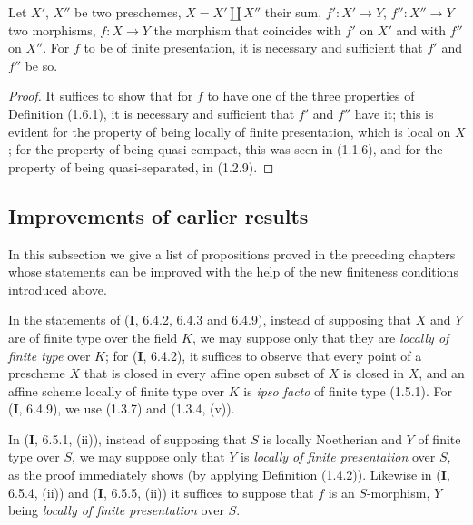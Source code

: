 \begin{proposition}[1.6.5]
\label{IV.1.6.5}
Let $X'$, $X''$ be two preschemes, $X=X'\amalg X''$ their sum,
$f':X'\to Y$, $f'':X''\to Y$ two morphisms, $f:X\to Y$ the morphism that
coincides with $f'$ on $X'$ and with $f''$ on $X''$. For $f$ to be of
finite presentation, it is necessary and sufficient that $f'$ and $f''$ be so.
\end{proposition}

\par\medskip\noindent
\begin{proof}
It suffices to show that for $f$ to have one of the three properties of
Definition
(1.6.1), it is necessary and sufficient that $f'$ and $f''$ have it; this is
evident for the property of being locally of finite presentation, which is
local on $X$; for the property of being quasi-compact, this was seen in
(1.1.6), and for the property of being quasi-separated, in (1.2.9).
\end{proof}


\subsection{Improvements of earlier results}
\label{subsection:IV.1.7}

In this subsection we give a list of propositions proved in the preceding
chapters whose statements can be improved with the help of the new
finiteness conditions introduced above.

\begin{env}[1.7.1]
\label{IV.1.7.1}
In the statements of (\textbf{I}, 6.4.2, 6.4.3 and 6.4.9), instead of supposing
that $X$ and $Y$ are of finite type over the field $K$, we may suppose only
that they are \emph{locally of finite type} over $K$; for (\textbf{I}, 6.4.2), it
suffices to observe that every point of a prescheme $X$ that is closed in
every affine open subset of $X$ is closed in $X$, and an affine scheme locally
of finite type over $K$ is \emph{ipso facto} of finite type (1.5.1). For
(\textbf{I}, 6.4.9), we use (1.3.7) and (1.3.4, (v)).
\end{env}

\begin{env}[1.7.2]
\label{IV.1.7.2}
In (\textbf{I}, 6.5.1, (ii)), instead of supposing that $S$ is locally
Noetherian and $Y$ of finite type over $S$, we may suppose only that $Y$ is
\emph{locally of finite presentation} over $S$, as the proof immediately
shows (by applying Definition (1.4.2)). Likewise in (\textbf{I}, 6.5.4,
(ii)) and (\textbf{I}, 6.5.5, (ii)) it suffices to suppose that $f$ is an
$S$-morphism, $Y$ being \emph{locally of finite presentation} over $S$.
\end{env}


